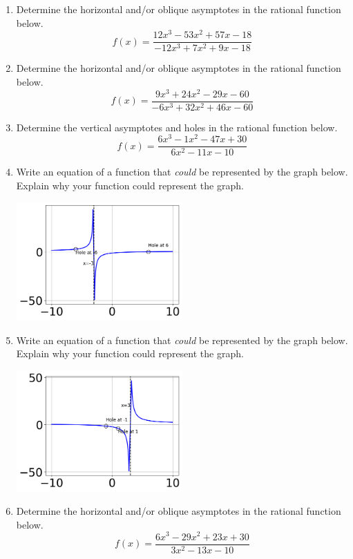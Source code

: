 \documentclass[14pt]{extbook}
\begin{document}
\begin{enumerate}
\item{
Determine the horizontal and/or oblique asymptotes in the rational function below.\[ f(x) = \frac{12x^{3} -53 x^{2} +57 x -18}{-12x^{3} +7 x^{2} +9 x -18} \]} \newpage
\item{
Determine the horizontal and/or oblique asymptotes in the rational function below.\[ f(x) = \frac{9x^{3} +24 x^{2} -29 x -60}{-6x^{3} +32 x^{2} +46 x -60} \]} \newpage
\item{
Determine the vertical asymptotes and holes in the rational function below.\[ f(x) = \frac{6x^{3} -1 x^{2} -47 x + 30}{6x^{2} -11 x -10} \]} \newpage
\item{
Write an equation of a function that \textit{could} be represented by the graph below. Explain why your function could represent the graph.
\begin{center}
    \includegraphics[width=0.5\textwidth]{../Figures/identifyGraphOfRationalFunctionC.png}
\end{center}
} \newpage
\item{
Write an equation of a function that \textit{could} be represented by the graph below. Explain why your function could represent the graph.
\begin{center}
    \includegraphics[width=0.5\textwidth]{../Figures/identifyGraphOfRationalFunctionCopyC.png}
\end{center}
} \newpage
\item{
Determine the horizontal and/or oblique asymptotes in the rational function below.\[ f(x) = \frac{6x^{3} -29 x^{2} +23 x + 30}{3x^{2} -13 x -10} \]} \newpage

\end{enumerate}
\end{document}
